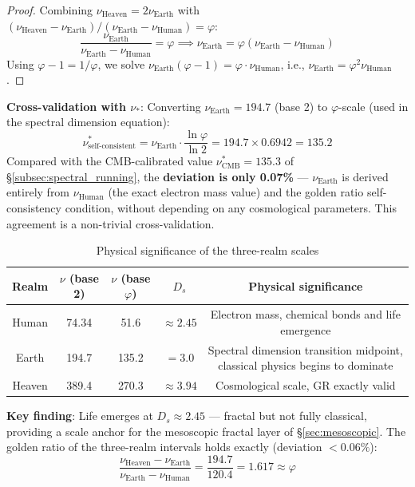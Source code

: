 \documentclass[12pt,a4paper,twocolumn]{article}
\renewcommand{\phi}{\varphi}
\begin{document}
\begin{proof}
Combining $\nu_{\text{Heaven}} = 2\nu_{\text{Earth}}$ with $(\nu_{\text{Heaven}} - \nu_{\text{Earth}})/(\nu_{\text{Earth}} - \nu_{\text{Human}}) = \phi$:
\[
\frac{\nu_{\text{Earth}}}{\nu_{\text{Earth}} - \nu_{\text{Human}}} = \phi \implies \nu_{\text{Earth}} = \phi(\nu_{\text{Earth}} - \nu_{\text{Human}})
\]
Using $\phi - 1 = 1/\phi$, we solve $\nu_{\text{Earth}}(\phi-1) = \phi\cdot\nu_{\text{Human}}$, i.e., $\nu_{\text{Earth}} = \phi^2 \nu_{\text{Human}}$.
\end{proof}

\textbf{Cross-validation with $\nu_*$}: Converting $\nu_{\text{Earth}} = 194.7$ (base 2) to $\phi$-scale (used in the spectral dimension equation):
\begin{equation}
\nu^*_{\text{self-consistent}} = \nu_{\text{Earth}} \cdot \frac{\ln\phi}{\ln 2} = 194.7 \times 0.6942 = 135.2
\end{equation}
Compared with the CMB-calibrated value $\nu^*_{\text{CMB}} = 135.3$ of \S\ref{subsec:spectral_running}, the \textbf{deviation is only 0.07\%} --- $\nu_{\text{Earth}}$ is derived entirely from $\nu_{\text{Human}}$ (the exact electron mass value) and the golden ratio self-consistency condition, without depending on any cosmological parameters. This agreement is a non-trivial cross-validation.

\begin{table}[H]
\centering
\caption{Physical significance of the three-realm scales}
\label{tab:three_realms}
\begin{tabular}{c|c|c|c|c}
\hline
Realm & $\nu$ (base 2) & $\nu$ (base $\phi$) & $D_s$ & Physical significance \\
\hline
Human & 74.34 & 51.6 & $\approx 2.45$ & Electron mass, chemical bonds and life emergence \\
Earth & 194.7 & 135.2 & $= 3.0$ & Spectral dimension transition midpoint, classical physics begins to dominate \\
Heaven & 389.4 & 270.3 & $\approx 3.94$ & Cosmological scale, GR exactly valid \\
\hline
\end{tabular}
\end{table}

\textbf{Key finding}: Life emerges at $D_s \approx 2.45$ --- fractal but not fully classical, providing a scale anchor for the mesoscopic fractal layer of \S\ref{sec:mesoscopic}. The golden ratio of the three-realm intervals holds exactly (deviation $< 0.06\%$):
\[
\frac{\nu_{\text{Heaven}} - \nu_{\text{Earth}}}{\nu_{\text{Earth}} - \nu_{\text{Human}}} = \frac{194.7}{120.4} = 1.617 \approx \phi
\]
\end{document}
